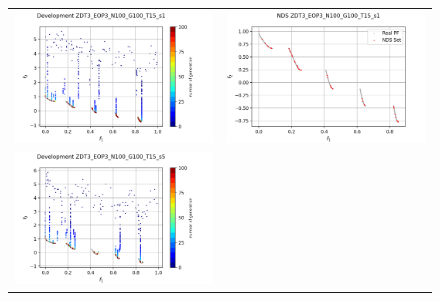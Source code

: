 
\begin{figure}[H]
    \centering
    \begin{tabular}{c c}
    \includegraphics[scale=0.45]{figures/ZDT3_EOP3_N100_G100_T15/s1_dev.png} &
    \includegraphics[scale=0.45]{figures/ZDT3_EOP3_N100_G100_T15/s1_nds.png}\\
    \includegraphics[scale=0.45]{figures/ZDT3_EOP3_N100_G100_T15/s5_dev.png} &

\end{tabular}
\end{figure}

